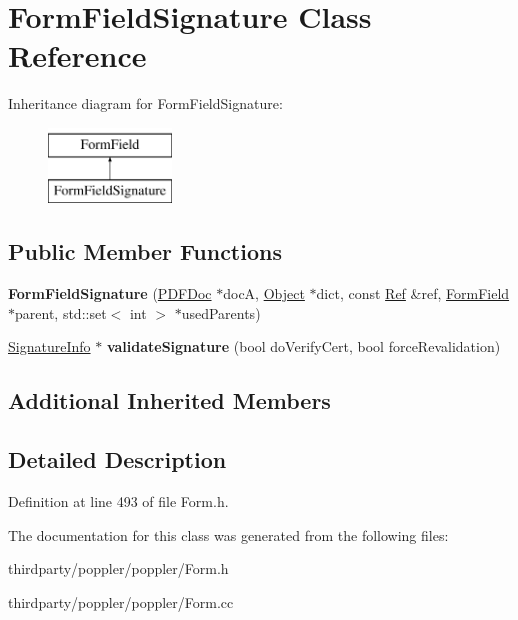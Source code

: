 \hypertarget{class_form_field_signature}{}\section{Form\+Field\+Signature Class Reference}
\label{class_form_field_signature}
Inheritance diagram for Form\+Field\+Signature\+:\begin{figure}[H]
\begin{center}
\leavevmode
\includegraphics[height=2.000000cm]{class_form_field_signature}
\end{center}
\end{figure}
\subsection*{Public Member Functions}
\begin{DoxyCompactItemize}
\item 
\mbox{\label{class_form_field_signature_a0513c10222991f4416d3726f2c42b869}} 
{\bfseries Form\+Field\+Signature} (\hyperlink{class_p_d_f_doc}{P\+D\+F\+Doc} $\ast$docA, \hyperlink{class_object}{Object} $\ast$dict, const \hyperlink{struct_ref}{Ref} \&ref, \hyperlink{class_form_field}{Form\+Field} $\ast$parent, std\+::set$<$ int $>$ $\ast$used\+Parents)
\item 
\mbox{\label{class_form_field_signature_a9b01ebfdc1da348265e67f01b18ce8fc}} 
\hyperlink{class_signature_info}{Signature\+Info} $\ast$ {\bfseries validate\+Signature} (bool do\+Verify\+Cert, bool force\+Revalidation)
\end{DoxyCompactItemize}
\subsection*{Additional Inherited Members}


\subsection{Detailed Description}


Definition at line 493 of file Form.\+h.



The documentation for this class was generated from the following files\+:\begin{DoxyCompactItemize}
\item 
thirdparty/poppler/poppler/Form.\+h\item 
thirdparty/poppler/poppler/Form.\+cc\end{DoxyCompactItemize}
